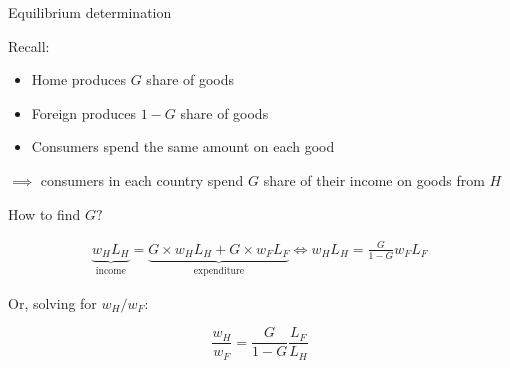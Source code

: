 \documentclass[notes,11pt, aspectratio=169, xcolor=table]{beamer}
\newenvironment{wideitemize}{\itemize\addtolength{\itemsep}{10pt}}{\enditemize}
\begin{document}
\begin{frame}{Equilibrium determination}
\begin{wideitemize}
    \item<1-> Recall:
    \begin{itemize}
        \item Home produces $G$ share of goods
        \item Foreign produces $1-G$ share of goods
        \item Consumers spend the same amount on each good
    \end{itemize}

    \item<1-> $\implies$ consumers in each country spend $G$ share of their income on goods from $H$

    \item<2-> How to find $G?$ 

    \begin{eqnarray*}
        \underbrace{w_HL_H}_{\text{income}} = \underbrace{G\times w_HL_H + G\times w_FL_F}_{\text{expenditure}} \iff w_HL_H = \frac{G}{1-G}w_FL_F
    \end{eqnarray*}

    \item<3-> Or, solving for $w_H / w_F$:

    \begin{equation*}
        \frac{w_H}{w_F} =  \frac{G}{1-G} \frac{L_F}{L_H}
    \end{equation*}
    
    \end{wideitemize}
\end{frame}
\end{document}
